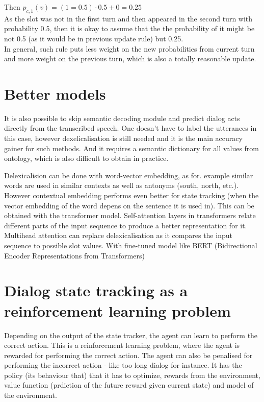 \documentclass[12pt,titlepage,a4paper]{article}
\begin{document}
\noindent Then $p_{c,1}(v) = (1 = 0.5) \cdot 0.5 + 0 = 0.25$ \\

\noindent As the slot was not in the first turn and then appeared in the second turn with probability 0.5, then it is okay to assume that the the probability of it might be not 0.5 (as it would be in previous update rule) but 0.25. \\

\noindent In general, such rule puts less weight on the new probabilities from current turn and more weight on the previous turn, which is also a totally reasonable update. 

\section{Better models}
It is also possible to skip semantic decoding module and predict dialog acts directly from the transcribed speech. One doesn't have to label the utterances in this case, however dexelicalisation is still needed and it is the main accuracy gainer for such methods. And it requires a semantic dictionary for all values from ontology, which is also difficult to obtain in practice.

Delexicalision can be done with word-vector embedding, as for. example similar words are used in similar contexts as well as antonyms (south, north, etc.). However contextual embedding performs even better for state tracking (when the vector embedding of the word depens on the sentence it is used in). This can be obtained with the transformer model. Self-attention layers in transformers relate different parts of the input sequence to produce a better representation for it. Multihead attention can replace delexicalisation as it compares the input sequence to possible slot values. With fine-tuned model like BERT (Bidirectional Encoder Representations from Transformers) 

\section{Dialog state tracking as a reinforcement learning problem}
Depending on the output of the state tracker, the agent can learn to perform the correct action. This is a reinforcement learning problem, where the agent is rewarded for performing the correct action. The agent can also be penalised for performing the incorrect action - like too long dialog for instance. It has the policy (its behaviour that) that it has to optimize, rewards from the environment, value function (prdiction of the future reward given current state) and model of the environment.
\end{document}

